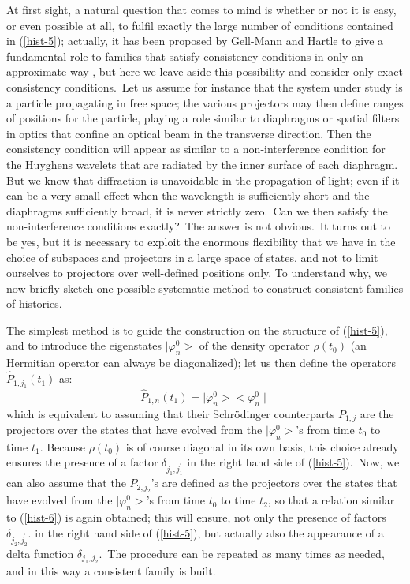 \documentclass[12pt,onecolumn]{article}%
\begin{document}
At first sight, a natural question that comes to mind is whether or not it is
easy, or even possible at all, to fulfil exactly the large number of
conditions contained in (\ref{hist-5}); actually, it has been proposed by
Gell-Mann and Hartle to give a fundamental role to families that satisfy
consistency conditions in only an approximate way \cite{Gell-Mann}, but here
we leave aside this possibility and consider only exact consistency
conditions.\ Let us assume for instance that the system under study is a
particle propagating in free space; the various projectors may then define
ranges of positions for the particle, playing a role similar to diaphragms or
spatial filters in optics that confine an optical beam in the transverse
direction. Then the consistency condition will appear as similar to a
non-interference condition for the Huyghens wavelets that are radiated by the
inner surface of each diaphragm. But we know that diffraction is unavoidable
in the propagation of light; even if it can be a very small effect when the
wavelength is sufficiently short and the diaphragms sufficiently broad, it is
never strictly zero.\ Can we then satisfy the non-interference conditions
exactly?\ The answer is not obvious.\ It turns out to be yes, but it is
necessary to exploit the enormous flexibility that we have in the choice of
subspaces and projectors in a large space of states, and not to limit
ourselves to projectors over well-defined positions only. To understand why,
we now briefly sketch one possible systematic method to construct consistent
families of histories.

The simplest method is to guide the construction on the structure of
(\ref{hist-5}), and to introduce the eigenstates $\mid\varphi_{n}^{0}>$ of the
density operator $\rho(t_{0})$ (an Hermitian operator can always be
diagonalized); let us then define the operators $\widehat{P}_{1,j_{1}}(t_{1})$
as:%
\begin{equation}
\widehat{P}_{1,n}(t_{1})=\mid\varphi_{n}^{0}><\varphi_{n}^{0}\mid
\label{hist-6}%
\end{equation}
which is equivalent to assuming that their Schr\"{o}dinger counterparts
$P_{1,j}$ are the projectors over the states that have evolved from the
$\mid\varphi_{n}^{0}>$'s from time $t_{0}$ to time $t_{1}$. Because
$\rho(t_{0})$ is of course diagonal in its own basis, this choice already
ensures the presence of a factor $\delta_{j_{1},j_{1}^{^{\prime}}}$ in the
right hand side of (\ref{hist-5}).\ Now, we can also assume that the
$P_{2,j_{2}}$'s are defined as the projectors over the states that have
evolved from the $\mid\varphi_{n}^{0}>$'s from time $t_{0}$ to time $t_{2}$,
so that a relation similar to (\ref{hist-6}) is again obtained; this will
ensure, not only the presence of factors $\delta_{j_{2},j_{2}^{^{\prime}}}$.
in the right hand side of (\ref{hist-5}), but actually also the appearance of
a delta function $\delta_{j_{1},j_{2}}$.\ The procedure can be repeated as
many times as needed, and in this way a consistent family is built.
\end{document}
